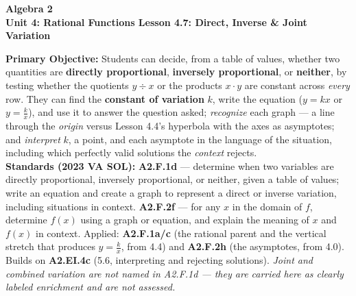 \documentclass[10pt]{article}
\newcommand{\CourseName}{Algebra 2}
\newcommand{\UnitNumberName}{Unit 4: Rational Functions \quad}
\newcommand{\LessonNumberName}{Lesson 4.7: Direct, Inverse \& Joint Variation}
\begin{document}
\begin{center}
    {\Large\bfseries \CourseName \\
    {\small\bfseries \UnitNumberName \LessonNumberName}}
\end{center}

\begin{tcolorbox}[colback=forestbg, colframe=forest, boxrule=0.9pt, arc=2mm,
    left=2mm, right=2mm, top=1.5mm, bottom=1.5mm]
    \textbf{Primary Objective:} Students can decide, from a table of values, whether two quantities are
    \textbf{directly proportional}, \textbf{inversely proportional}, or \textbf{neither}, by testing
    whether the quotients $y\div x$ or the products $x\cdot y$ are constant across \emph{every} row.
    They can find the \textbf{constant of variation} $k$, write the equation ($y=kx$ or $y=\frac kx$),
    and use it to answer the question asked; \emph{recognize} each graph --- a line through the
    \emph{origin} versus Lesson 4.4's hyperbola with the axes as asymptotes; and \emph{interpret} $k$, a
    point, and each asymptote in the language of the situation, including which perfectly valid
    solutions the \emph{context} rejects.
    \\[2pt]
    \textbf{Standards (2023 VA SOL):} \textbf{A2.F.1d} --- determine when two variables are directly
    proportional, inversely proportional, or neither, given a table of values; write an equation and
    create a graph to represent a direct or inverse variation, including situations in context.
    \textbf{A2.F.2f} --- for any $x$ in the domain of $f$, determine $f(x)$ using a graph or equation,
    and explain the meaning of $x$ and $f(x)$ in context. Applied: \textbf{A2.F.1a/c} (the rational
    parent and the vertical stretch that produces $y=\frac kx$, from 4.4) and \textbf{A2.F.2h}
    (the asymptotes, from 4.0). Builds on \textbf{A2.EI.4c} (5.6, interpreting and rejecting solutions).
    \emph{Joint and combined variation are not named in A2.F.1d --- they are carried here as clearly
    labeled enrichment and are not assessed.}
\end{tcolorbox}
\end{document}
